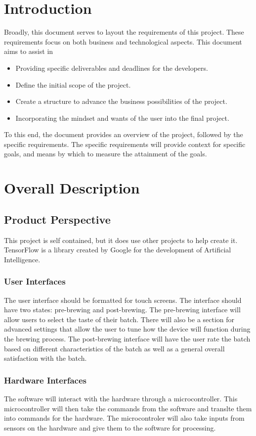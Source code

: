 \documentclass[draftclsnofoot,onecolumn,letterpaper,10pt]{article}
\begin{document}
\section{Introduction}
Broadly, this document serves to layout the requirements of this project.
These requirements focus on both business and technological aspects.
This document aims to assist in
\begin{itemize}
	\item Providing specific deliverables and deadlines for the developers.
	\item Define the initial scope of the project.
	\item Create a structure to advance the business possibilities of the project.
	\item Incorporating the mindset and wants of the user into the final project.
\end{itemize}
To this end, the document provides an overview of the project, followed by the specific requirements.
The specific requirements will provide context for specific goals, and means by which to measure the attainment of the goals.

\section{Overall Description}
\subsection{Product Perspective}
This project is self contained, but it does use other projects to help create it.
TensorFlow is a library created by Google for the development of Artificial Intelligence.

\subsubsection{User Interfaces}
The user interface should be formatted for touch screens.
The interface should have two states: pre-brewing and post-brewing.
The pre-brewing interface will allow users to select the taste of their batch.
There will also be a section for advanced settings that allow the user to tune how the device will function during the brewing process.
The post-brewing interface will have the user rate the batch based on different characteristics of the batch as well as a general overall satisfaction with the batch.

\subsubsection{Hardware Interfaces}
The software will interact with the hardware through a microcontroller.
This microcontroller will then take the commands from the software and translte them into commands for the hardware.
The microcontroler will also take inputs from sensors on the hardware and give them to the software for processing.
\end{document}
